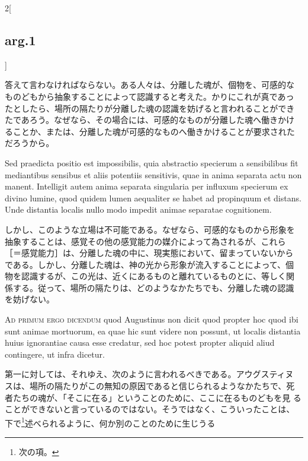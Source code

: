 \documentclass[paper=a4paper,fontsize=10pt,jafontsize=9pt,titlepage]{jlreq}
\begin{document}
\begin{paracol}{2}[\subsection{arg.1}]
\switchcolumn

答えて言わなければならない。ある人々は、分離した魂が、個物を、可感的な
ものどもから抽象することによって認識すると考えた。かりにこれが真であっ
たとしたら、場所の隔たりが分離した魂の認識を妨げると言われることができ
たであろう。なぜなら、その場合には、可感的なものが分離した魂へ働きかけ
ることか、または、分離した魂が可感的なものへ働きかけることが要求された
だろうから。

\switchcolumn*

Sed praedicta positio est impossibilis, quia abstractio specierum a
sensibilibus fit mediantibus sensibus et aliis potentiis sensitivis,
quae in anima separata actu non manent. Intelligit autem anima
separata singularia per influxum specierum ex divino lumine, quod
quidem lumen aequaliter se habet ad propinquum et distans. Unde
distantia localis nullo modo impedit animae separatae cognitionem.

\switchcolumn

しかし、このような立場は不可能である。なぜなら、可感的なものから形象を
抽象することは、感覚その他の感覚能力の媒介によって為されるが、これら
［＝感覚能力］は、分離した魂の中に、現実態において、留まっていないから
である。しかし、分離した魂は、神の光から形象が流入することによって、個
物を認識するが、この光は、近くにあるものと離れているものとに、等しく関
係する。従って、場所の隔たりは、どのようなかたちでも、分離した魂の認識
を妨げない。

\switchcolumn*[\subsection{ad.1}]

{\scshape Ad primum ergo dicendum} quod Augustinus non dicit quod propter
hoc quod ibi sunt animae mortuorum, ea quae hic sunt videre non
possunt, ut localis distantia huius ignorantiae causa esse credatur,
sed hoc potest propter aliquid aliud contingere, ut infra dicetur.

\switchcolumn

第一に対しては、それゆえ、次のように言われるべきである。アウグスティヌ
スは、場所の隔たりがこの無知の原因であると信じられるようなかたちで、死
者たちの魂が、「そこに在る」ということのために、ここに在るものどもを見
ることができないと言っているのではない。そうではなく、こういったことは、
下で\footnote{次の項。}述べられるように、何か別のことのために生じうる

\switchcolumn*[\subsection{ad.2}]


\end{paracol}
\end{document}
